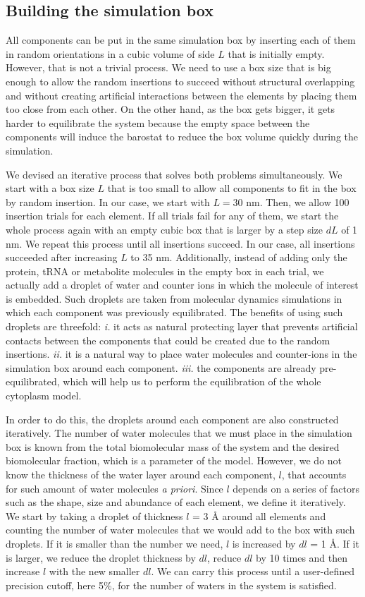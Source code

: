 \documentclass[journal=jpcisd8,manuscript=article]{achemso}
\begin{document}
\subsection{Building the simulation box}
All components can be put in the same simulation box by inserting each
of them in random orientations in a cubic volume of side $L$ that is
initially empty. However, that is not a trivial process. We need to
use a box size that is big enough to allow the random insertions to
succeed without structural overlapping and without creating artificial
interactions between the elements by placing them too close from each
other. On the other hand, as the box gets bigger, it gets harder to
equilibrate the system because the empty space between the components
will induce the barostat to reduce the box volume quickly during the
simulation.

We devised an iterative process that solves both problems
simultaneously. We start with a box size $L$ that is too small to
allow all components to fit in the box by random insertion. In our
case, we start with $L = 30$ nm. Then, we allow 100 insertion trials
for each element. If all trials fail for any of them, we start the
whole process again with an empty cubic box that is larger by a step
size $dL$ of 1 nm. We repeat this process until all insertions
succeed. In our case, all insertions succeeded after increasing $L$ to
35 nm. Additionally, instead of adding only the protein, tRNA or
metabolite molecules in the empty box in each trial, we actually add a
droplet of water and counter ions in which the molecule of interest is
embedded. Such droplets are taken from molecular dynamics simulations
in which each component was previously equilibrated. The benefits of
using such droplets are threefold: \textit{i.} it acts as natural
protecting layer that prevents artificial contacts between the
components that could be created due to the random
insertions. \textit{ii.} it is a natural way to place water molecules
and counter-ions in the simulation box around each
component. \textit{iii.} the components are already pre-equilibrated,
which will help us to perform the equilibration of the whole cytoplasm
model.

In order to do this, the droplets around each component are also
constructed iteratively. The number of water molecules that we must
place in the simulation box is known from the total biomolecular mass
of the system and the desired biomolecular fraction, which is a
parameter of the model. However, we do not know the thickness of the
water layer around each component, $l$, that accounts for such amount
of water molecules \textit{a priori}. Since $l$ depends on a series of
factors such as the shape, size and abundance of each element, we
define it iteratively. We start by taking a droplet of thickness $l$ =
3 \r{A} around all elements and counting the number of water molecules
that we would add to the box with such droplets. If it is smaller than
the number we need, $l$ is increased by $dl$ = 1 \r{A}. If it is
larger, we reduce the droplet thickness by $dl$, reduce $dl$ by 10
times and then increase $l$ with the new smaller $dl$. We can carry
this process until a user-defined precision cutoff, here 5\%, for the
number of waters in the system is satisfied.
\end{document}
